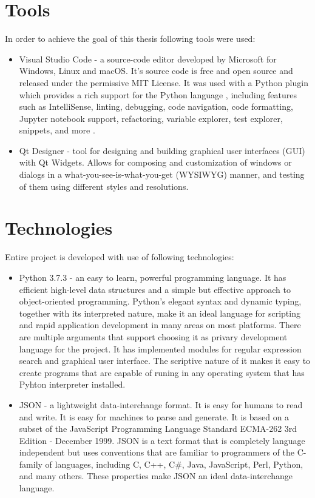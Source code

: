 \documentclass[a4paper,twoside,12pt]{book}
\begin{document}
\section{Tools}
In order to achieve the goal of this thesis following tools were used:
\begin{itemize}
   \item Visual Studio Code - a source-code editor developed by Microsoft for Windows, Linux and macOS. It's source code is free and open source and 
   released under the permissive MIT License. It was used with a Python plugin which provides a rich support for the Python language , including 
   features such as IntelliSense, linting, debugging, code navigation, code formatting, Jupyter notebook support, refactoring, variable explorer, 
   test explorer, snippets, and more \cite{bib:internetVSC}\cite{bib:internetVSCLicence}.
   \item Qt Designer - tool for designing and building graphical user interfaces (GUI) with Qt Widgets. Allows for composing and customization 
   of windows or dialogs in a what-you-see-is-what-you-get (WYSIWYG) manner, and testing of them using different styles and resolutions\cite{bib:internetQt}.
\end{itemize} 
\section{Technologies}
Entire project is developed with use of following technologies:
\begin{itemize}
   \item Python 3.7.3 - an easy to learn, powerful programming language. It has efficient high-level data structures 
   and a simple but effective approach to object-oriented programming. Python’s elegant syntax and dynamic typing, together with its interpreted nature, make it 
   an ideal language for scripting and rapid application development in many areas on most platforms\cite{bib:bookPython}. There are multiple arguments that support
   choosing it as privary development language for the project. It has implemented modules for regular expression search and graphical user interface.
   The scriptive nature of it makes it easy to create programs that are capable of runing in any operating system that has Pyhton interpreter installed.
   \item JSON - a lightweight data-interchange format. It is easy for humans to read and write. It is easy for machines to parse and generate. It is based on a
   subset of the JavaScript Programming Language Standard ECMA-262 3rd Edition - December 1999. JSON is a text format that is completely language independent but
   uses conventions that are familiar to programmers of the C-family of languages, including C, C++, C\#, Java, JavaScript, Perl, Python, and many others. These
   properties make JSON an ideal data-interchange language\cite{bib:internetJSON}.
\end{itemize}
\end{document}
